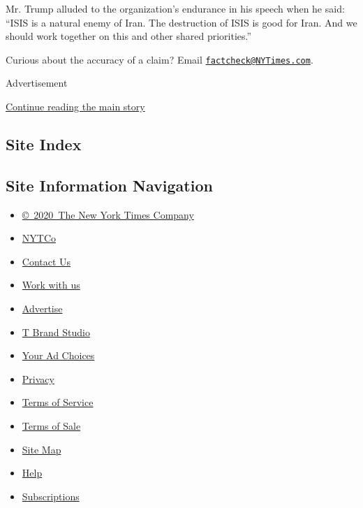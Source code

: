 Mr. Trump alluded to the organization's endurance in his speech when he
said: ``ISIS is a natural enemy of Iran. The destruction of ISIS is good
for Iran. And we should work together on this and other shared
priorities.''

Curious about the accuracy of a claim? Email
\href{mailto:factcheck@NYTimes.com}{\nolinkurl{factcheck@NYTimes.com}}.

Advertisement

\protect\hyperlink{after-bottom}{Continue reading the main story}

\hypertarget{site-index}{%
\subsection{Site Index}\label{site-index}}

\hypertarget{site-information-navigation}{%
\subsection{Site Information
Navigation}\label{site-information-navigation}}

\begin{itemize}
\tightlist
\item
  \href{https://help.nytimes3xbfgragh.onion/hc/en-us/articles/115014792127-Copyright-notice}{©~2020~The
  New York Times Company}
\end{itemize}

\begin{itemize}
\tightlist
\item
  \href{https://www.nytco.com/}{NYTCo}
\item
  \href{https://help.nytimes3xbfgragh.onion/hc/en-us/articles/115015385887-Contact-Us}{Contact
  Us}
\item
  \href{https://www.nytco.com/careers/}{Work with us}
\item
  \href{https://nytmediakit.com/}{Advertise}
\item
  \href{http://www.tbrandstudio.com/}{T Brand Studio}
\item
  \href{https://www.nytimes3xbfgragh.onion/privacy/cookie-policy\#how-do-i-manage-trackers}{Your
  Ad Choices}
\item
  \href{https://www.nytimes3xbfgragh.onion/privacy}{Privacy}
\item
  \href{https://help.nytimes3xbfgragh.onion/hc/en-us/articles/115014893428-Terms-of-service}{Terms
  of Service}
\item
  \href{https://help.nytimes3xbfgragh.onion/hc/en-us/articles/115014893968-Terms-of-sale}{Terms
  of Sale}
\item
  \href{https://spiderbites.nytimes3xbfgragh.onion}{Site Map}
\item
  \href{https://help.nytimes3xbfgragh.onion/hc/en-us}{Help}
\item
  \href{https://www.nytimes3xbfgragh.onion/subscription?campaignId=37WXW}{Subscriptions}
\end{itemize}
